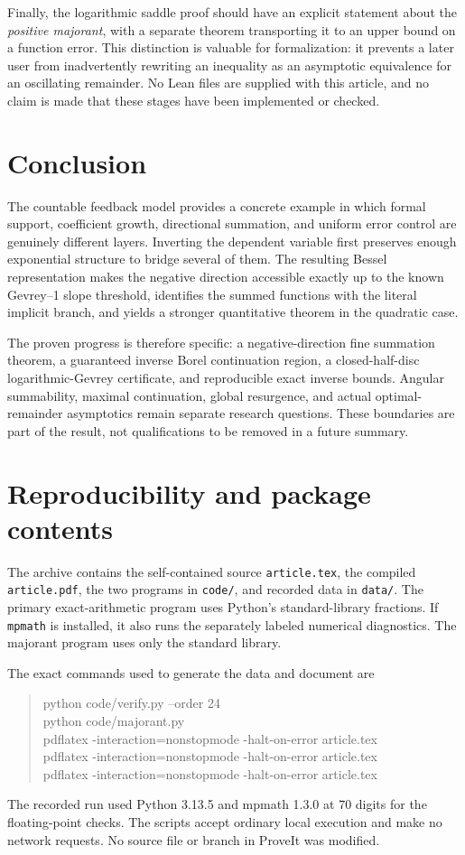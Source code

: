 \documentclass[11pt,a4paper]{article}
\numberwithin{equation}{section}
\theoremstyle{definition}
\theoremstyle{remark}
\begin{document}
Finally, the logarithmic saddle proof should have an explicit statement
about the \emph{positive majorant}, with a separate theorem transporting
it to an upper bound on a function error.  This distinction is valuable
for formalization: it prevents a later user from inadvertently rewriting
an inequality as an asymptotic equivalence for an oscillating remainder.
No Lean files are supplied with this article, and no claim is made that
these stages have been implemented or checked.

\section{Conclusion}
The countable feedback model provides a concrete example in which formal
support, coefficient growth, directional summation, and uniform error
control are genuinely different layers.  Inverting the dependent variable
first preserves enough exponential structure to bridge several of them.
The resulting Bessel representation makes the negative direction
accessible exactly up to the known Gevrey--1 slope threshold, identifies
the summed functions with the literal implicit branch, and yields a
stronger quantitative theorem in the quadratic case.

The proven progress is therefore specific: a negative-direction fine
summation theorem, a guaranteed inverse Borel continuation region, a
closed-half-disc logarithmic-Gevrey certificate, and reproducible exact
inverse bounds.  Angular summability, maximal continuation, global
resurgence, and actual optimal-remainder asymptotics remain separate
research questions.  These boundaries are part of the result, not
qualifications to be removed in a future summary.

\appendix
\section{Reproducibility and package contents}
\label{sec:reproduce}
The archive contains the self-contained source \texttt{article.tex}, the
compiled \texttt{article.pdf}, the two programs in \texttt{code/}, and
recorded data in \texttt{data/}.  The primary exact-arithmetic program uses
Python's standard-library fractions.  If \texttt{mpmath} is installed, it
also runs the separately labeled numerical diagnostics.  The majorant
program uses only the standard library.

The exact commands used to generate the data and document are
\begin{quote}\small\ttfamily
python code/verify.py --order 24\\
python code/majorant.py\\
pdflatex -interaction=nonstopmode -halt-on-error article.tex\\
pdflatex -interaction=nonstopmode -halt-on-error article.tex\\
pdflatex -interaction=nonstopmode -halt-on-error article.tex
\end{quote}
The recorded run used Python 3.13.5 and mpmath 1.3.0 at 70 digits for the
floating-point checks.  The scripts accept ordinary local execution and
make no network requests.  No source file or branch in ProveIt was modified.
\end{document}
